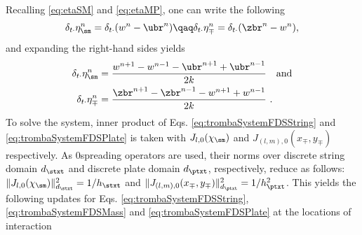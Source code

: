 Recalling \eqref{eq:etaSM} and \eqref{eq:etaMP}, one can write the following
\begin{equation*}
    \delta_{t\cdot}\eta_\sm^n = \delta_{t\cdot}(w^n - \ubr^n) \qaq\delta_{t\cdot}\eta_\mp^n = \delta_{t\cdot}(\zbr^n - w^n),
\end{equation*}
and expanding the right-hand sides yields
\begin{equation}\label{eq:expandedEtas}
\begin{aligned}
    \delta_{t\cdot}\eta_\sm^n &= \frac{w^{n+1}-w^{n-1}-\ubr^{n+1}+\ubr^{n-1}}{2k} \quad \text{and}\\ \delta_{t\cdot}\eta_\mp^n &= \frac{\zbr^{n+1}-\zbr^{n-1}-w^{n+1}+w^{n-1}}{2k}\ .
    \end{aligned}
\end{equation}
To solve the system, inner product of Eqs. \eqref{eq:trombaSystemFDSString} and \eqref{eq:trombaSystemFDSPlate} is taken with $J_{l,0}(\chi_\sm)$ and $J_{(l,m),0}(x_\mp, y_\mp)$ respectively. As $0$\thOrder spreading operators are used, their norms over discrete string domain $d_\stxt$ and discrete plate domain $d_\ptxt$, respectively, reduce as follows: $\lVert J_{l,0}(\chi_\sm) \rVert_{d_\stxt}^2 = 1/h_\stxt$ and $\lVert J_{(l,m),0}(x_\mp, y_\mp)\rVert_{d_\ptxt}^2 = 1/h_\ptxt^2$. This yields the following updates for Eqs. \eqref{eq:trombaSystemFDSString}, \eqref{eq:trombaSystemFDSMass} and \eqref{eq:trombaSystemFDSPlate} at the locations of interaction
